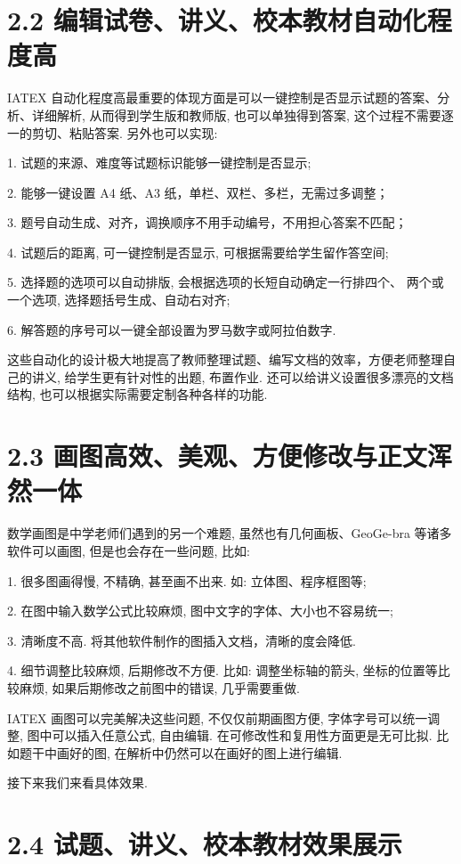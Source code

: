 \documentclass[10pt]{article}
\begin{document}
\section*{2.2 编辑试卷、讲义、校本教材自动化程度高}

IATEX 自动化程度高最重要的体现方面是可以一键控制是否显示试题的答案、分析、详细解析, 从而得到学生版和教师版, 也可以单独得到答案, 这个过程不需要逐一的剪切、粘贴答案. 另外也可以实现:

1. 试题的来源、难度等试题标识能够一键控制是否显示;

2. 能够一键设置 A4 纸、A3 纸，单栏、双栏、多栏，无需过多调整；

3. 题号自动生成、对齐，调换顺序不用手动编号，不用担心答案不匹配；

4. 试题后的距离, 可一键控制是否显示, 可根据需要给学生留作答空间;

5. 选择题的选项可以自动排版, 会根据选项的长短自动确定一行排四个、 两个或一个选项, 选择题括号生成、自动右对齐;

6. 解答题的序号可以一键全部设置为罗马数字或阿拉伯数字.

这些自动化的设计极大地提高了教师整理试题、编写文档的效率，方便老师整理自己的讲义, 给学生更有针对性的出题, 布置作业. 还可以给讲义设置很多漂亮的文档结构, 也可以根据实际需要定制各种各样的功能.

\section*{2.3 画图高效、美观、方便修改与正文浑然一体}

数学画图是中学老师们遇到的另一个难题, 虽然也有几何画板、GeoGe-bra 等诸多软件可以画图, 但是也会存在一些问题, 比如:

1. 很多图画得慢, 不精确, 甚至画不出来. 如: 立体图、程序框图等;

2. 在图中输入数学公式比较麻烦, 图中文字的字体、大小也不容易统一;

3. 清晰度不高. 将其他软件制作的图插入文档，清晰的度会降低.

4. 细节调整比较麻烦, 后期修改不方便. 比如: 调整坐标轴的箭头, 坐标的位置等比较麻烦, 如果后期修改之前图中的错误, 几乎需要重做.

IATEX 画图可以完美解决这些问题, 不仅仅前期画图方便, 字体字号可以统一调整, 图中可以插入任意公式, 自由编辑. 在可修改性和复用性方面更是无可比拟. 比如题干中画好的图, 在解析中仍然可以在画好的图上进行编辑.

接下来我们来看具体效果.

\section*{2.4 试题、讲义、校本教材效果展示}
\end{document}
